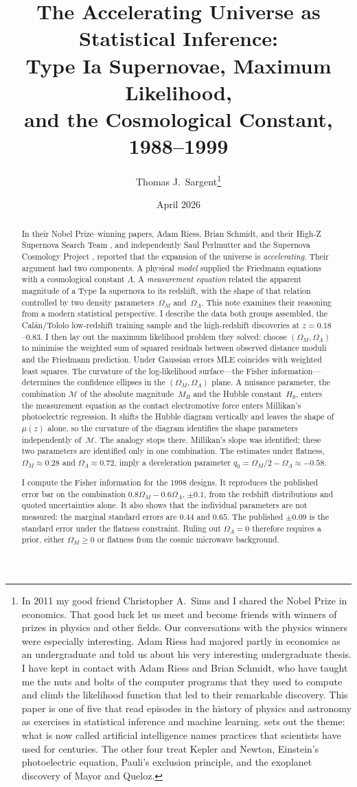 \documentclass[12pt]{article}
\title{The Accelerating Universe as Statistical Inference:\\
       Type Ia Supernovae, Maximum Likelihood,\\
       and the Cosmological Constant, 1988--1999}
\author{Thomas J.\ Sargent\thanks{%
  In 2011 my good friend Christopher A.\ Sims and I shared the Nobel Prize in
  economics.  That good luck let us meet and become friends with winners of
  prizes in physics and other fields.  Our conversations with the physics
  winners were especially interesting.  Adam Riess had majored partly in
  economics as an undergraduate and told us about his very interesting
  undergraduate thesis.  I have kept in contact with Adam Riess and Brian
  Schmidt, who have taught me the nuts and bolts of the computer programs that
  they used to compute and climb the likelihood function that led to their
  remarkable discovery.
  This paper is one of five that read episodes in the
  history of physics and astronomy as exercises in statistical inference and
  machine learning.  \citet{sargent2025sources} sets out the theme: what is
  now called artificial intelligence names practices that scientists have used
  for centuries.  The other four treat Kepler and Newton, Einstein's photoelectric equation,
  Pauli's exclusion principle, and the exoplanet discovery of Mayor and
  Queloz.}}
\date{April 2026}
\begin{document}
\maketitle

\begin{abstract}
In their Nobel Prize--winning papers, Adam Riess, Brian Schmidt, and their
High-Z Supernova Search Team \citep{Riess1998}, and independently Saul
Perlmutter and the Supernova Cosmology Project \citep{Perlmutter1999},
reported that the expansion of the universe is \emph{accelerating}.
Their argument had two components.  A physical \emph{model} supplied the
Friedmann equations with a cosmological constant $\Lambda$.  A
\emph{measurement equation} related the apparent magnitude of a Type Ia
supernova to its redshift, with the shape of that relation controlled by two
density parameters~$\Omega_M$ and~$\Omega_\Lambda$.  This note examines their
reasoning from a modern statistical perspective.  I describe the data both
groups assembled, the Cal\'an/Tololo low-redshift training sample and the
high-redshift discoveries at $z = 0.18$--$0.83$.  I then lay out the maximum
likelihood problem they solved: choose $(\Omega_M, \Omega_\Lambda)$ to
minimise the weighted sum of squared residuals between observed distance
moduli and the Friedmann prediction.  Under Gaussian errors MLE coincides with
weighted least squares.  The curvature of the log-likelihood surface---the Fisher
information---determines the confidence ellipses in the
$(\Omega_M, \Omega_\Lambda)$ plane.  A nuisance parameter, the combination
$\mathcal{M}$ of the absolute magnitude~$M_B$ and the Hubble
constant~$H_0$, enters the measurement equation as the contact
electromotive force enters Millikan's photoelectric regression.  It shifts
the Hubble diagram vertically and leaves the shape of $\mu(z)$ alone, so the
curvature of the diagram identifies the shape parameters independently
of~$\mathcal{M}$.  The analogy stops there.  Millikan's slope was identified;
these two parameters are identified only in one combination.  The estimates
under flatness, $\Omega_M \approx 0.28$ and
$\Omega_\Lambda \approx 0.72$, imply a deceleration parameter
$q_0 = \Omega_M/2 - \Omega_\Lambda \approx -0.58$.

I compute the Fisher information for the 1998 designs.  It reproduces the
published error bar on the combination $0.8\Omega_M - 0.6\Omega_\Lambda$,
$\pm0.1$, from the redshift distributions and quoted uncertainties alone.  It
also shows that the individual parameters are not measured: the marginal
standard errors are $0.44$ and $0.65$.  The published $\pm0.09$ is the
standard error under the flatness constraint.  Ruling out
$\Omega_\Lambda = 0$ therefore requires a prior, either $\Omega_M \geq 0$ or
flatness from the cosmic microwave background.


\end{abstract}
\end{document}
